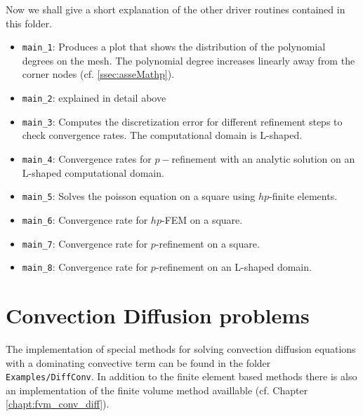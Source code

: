 Now we shall give a short explanation of the other driver routines contained in this folder.

\begin{itemize}
 \item \texttt{main\_1}: Produces a plot that shows the distribution of the polynomial degrees on the mesh. The polynomial degree increases linearly away from the corner nodes (cf. \ref{ssec:asseMathp}).
 
 \item \texttt{main\_2}: explained in detail above
 
 \item \texttt{main\_3}: Computes the discretization error for different refinement steps to check convergence rates. The computational domain is L-shaped.
 
 \item \texttt{main\_4}: Convergence rates for $p-$refinement with an analytic solution on an L-shaped computational domain.
 
 \item \texttt{main\_5}: Solves the poisson equation on a square using $hp$-finite elements.
 
 \item \texttt{main\_6}: Convergence rate for $hp$-FEM on a square.
 
 \item \texttt{main\_7}: Convergence rate for $p$-refinement on a square.
 
 \item \texttt{main\_8}: Convergence rate for $p$-refinement on an L-shaped domain.
\end{itemize}






\section{Convection Diffusion problems}

The implementation of special methods for solving convection diffusion equations with a dominating convective term can be found in the folder \texttt{Examples/DiffConv}. In addition to the finite element based methods there is also an implementation of the finite volume method availlable (cf. Chapter \ref{chapt:fvm_conv_diff}).

